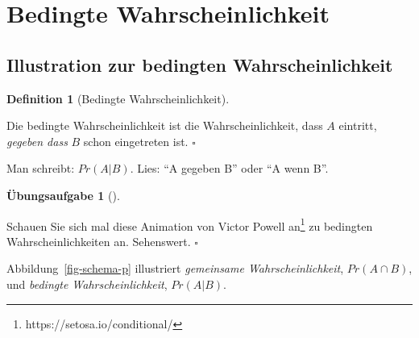 \documentclass[
  ngerman,
  letterpaper,
  twoside,
  open=any]{scrbook}
\theoremstyle{definition}
\theoremstyle{plain}
\theoremstyle{definition}
\newtheorem{exercise}{Übungsaufgabe}[chapter]
\theoremstyle{definition}
\newtheorem{definition}{Definition}[chapter]
\theoremstyle{definition}
\theoremstyle{definition}
\newtheorem{exercise}{Übungsaufgabe}[chapter]
\theoremstyle{remark}
\begin{document}
\section{Bedingte Wahrscheinlichkeit}\label{bedingte-wahrscheinlichkeit}

\subsection{Illustration zur bedingten
Wahrscheinlichkeit}\label{illustration-zur-bedingten-wahrscheinlichkeit}

\begin{definition}[Bedingte
Wahrscheinlichkeit]\protect\hypertarget{def-pr-cond}{}\label{def-pr-cond}

Die bedingte Wahrscheinlichkeit ist die Wahrscheinlichkeit, dass \(A\)
eintritt, \emph{gegeben dass} \(B\) schon eingetreten ist. \(\square\)

\end{definition}

Man schreibt: \(Pr(A|B).\) Lies: \enquote{A gegeben B} oder \enquote{A
wenn B}.

\begin{exercise}[]\protect\hypertarget{exr-victorpowell}{}\label{exr-victorpowell}

Schauen Sie sich mal diese Animation von Victor Powell an\footnote{https://setosa.io/conditional/}
zu bedingten Wahrscheinlichkeiten an. Sehenswert. \(\square\)

\end{exercise}

Abbildung~\ref{fig-schema-p} illustriert \emph{gemeinsame
Wahrscheinlichkeit}, \(Pr(A \cap B)\), und \emph{bedingte
Wahrscheinlichkeit}, \(Pr(A|B)\).
\end{document}
